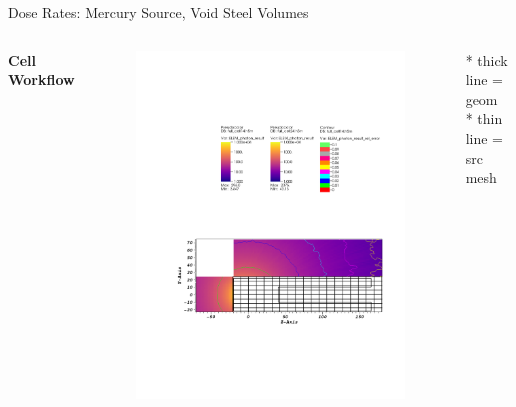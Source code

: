 \documentclass{beamer}
\begin{document}
\begin{frame}{Dose Rates: Mercury Source, Void Steel Volumes}
\begin{columns}[T]
        \textbf{Cell Workflow}
        \begin{figure}
                \centering
                \includegraphics[scale=0.49,trim={2.5cm 6cm 1cm 15cm},clip]{figs/dose_mer_cell_void.pdf}
        \end{figure}


	\tiny{* thick line = geom} \\
	\tiny{* thin line = src mesh}


\end{columns}
\end{frame}
\end{document}
